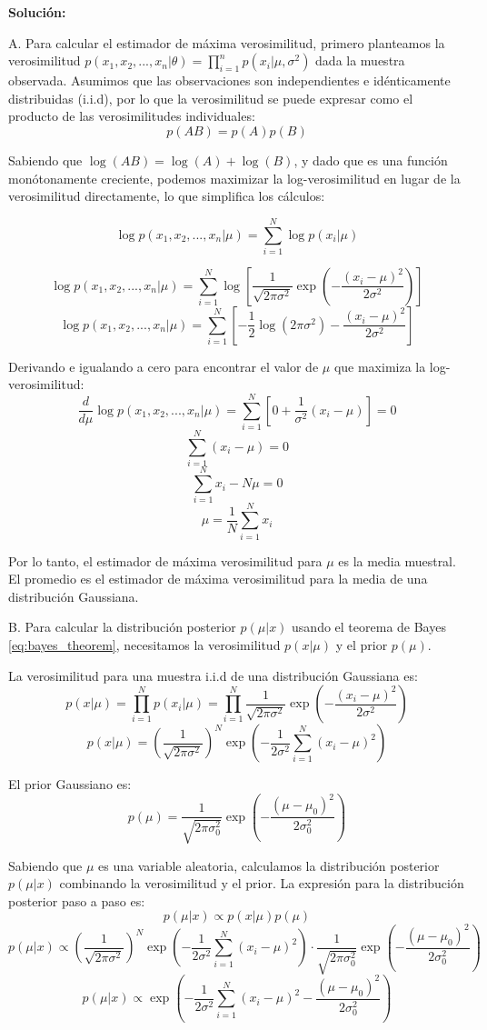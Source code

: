 \textbf{Solución:}

A. Para calcular el estimador de máxima verosimilitud, primero planteamos la verosimilitud \(p(x_1,x_2, ...,x_n|\theta) = \prod_{i=1}^{n} p(x_i|\mu, \sigma^2)\) dada la muestra observada. Asumimos que las observaciones son independientes e idénticamente distribuidas (i.i.d), por lo que la verosimilitud se puede expresar como el producto de las verosimilitudes individuales:
\[p(AB)=p(A)p(B)\]

Sabiendo que \(\log(AB)=\log(A)+\log(B)\), y dado que es una función monótonamente creciente, podemos maximizar la log-verosimilitud en lugar de la verosimilitud directamente, lo que simplifica los cálculos: 

\[\log p(x_1,x_2, ...,x_n|\mu)=\sum_{i=1}^{N}\log p(x_{i}|\mu)\]

\[\log p(x_1,x_2, ...,x_n|\mu)=\sum_{i=1}^{N}\log \left[\frac{1}{\sqrt{2\pi\sigma^2}}\exp\left(-\frac{(x_i-\mu)^2}{2\sigma^2}\right)\right]
\]
\[\log p(x_1,x_2, ...,x_n|\mu)=\sum_{i=1}^{N}\left[-\frac{1}{2}\log(2\pi\sigma^2)-\frac{(x_i-\mu)^2}{2\sigma^2}\right]\]

Derivando e igualando a cero para encontrar el valor de \(\mu\) que maximiza la log-verosimilitud:
\[\frac{d}{d\mu}\log p(x_1,x_2, ...,x_n|\mu)=\sum_{i=1}^{N}\left[0+\frac{1}{\sigma^2}(x_i-\mu)\right]=0\]
\[\sum_{i=1}^{N}(x_i-\mu)=0\]
\[\sum_{i=1}^{N}x_i-N\mu=0\]
\[\mu=\frac{1}{N}\sum_{i=1}^{N}x_i\]

Por lo tanto, el estimador de máxima verosimilitud para \(\mu\) es la media muestral. El promedio es el estimador de máxima verosimilitud para la media de una distribución Gaussiana.

B. Para calcular la distribución posterior \(p(\mu|x)\) usando el teorema de Bayes \eqref{eq:bayes_theorem}, necesitamos la verosimilitud \(p(x|\mu)\) y el prior \(p(\mu)\).

La verosimilitud para una muestra i.i.d de una distribución Gaussiana es:
\[p(x|\mu) = \prod_{i=1}^{N} p(x_i|\mu) = \prod_{i=1}^{N} \frac{1}{\sqrt{2\pi\sigma^2}} \exp\left(-\frac{(x_i - \mu)^2}{2\sigma^2}\right)\]
\[p(x|\mu) = \left(\frac{1}{\sqrt{2\pi\sigma^2}}\right)^N \exp\left(-\frac{1}{2\sigma^2}\sum_{i=1}^{N}(x_i - \mu)^2\right)\]

El prior Gaussiano es:
\[p(\mu) = \frac{1}{\sqrt{2\pi\sigma_0^2}} \exp\left(-\frac{(\mu - \mu_0)^2}{2\sigma_0^2}\right)\]

Sabiendo que \(\mu\) es una variable aleatoria, calculamos la distribución posterior \(p(\mu|x)\) combinando la verosimilitud y el prior. La expresión para la distribución posterior paso a paso es:
\[p(\mu|x) \propto p(x|\mu)p(\mu)\]
\[p(\mu|x) \propto \left(\frac{1}{\sqrt{2\pi\sigma^2}}\right)^N \exp\left(-\frac{1}{2\sigma^2}\sum_{i=1}^{N}(x_i - \mu)^2\right) \cdot \frac{1}{\sqrt{2\pi\sigma_0^2}} \exp\left(-\frac{(\mu - \mu_0)^2}{2\sigma_0^2}\right)\]
\[p(\mu|x) \propto \exp\left(-\frac{1}{2\sigma^2}\sum_{i=1}^{N}(x_i - \mu)^2 - \frac{(\mu - \mu_0)^2}{2\sigma_0^2}\right)\]

